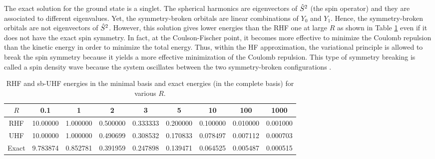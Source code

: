 \documentclass[11pt,a4paper]{article}
\newcommand{\hS}{\Hat{S}}
\begin{document}
The exact solution for the ground state is a singlet. The spherical harmonics are eigenvectors of $\hS^2$ (the spin operator) and they are associated to different eigenvalues. Yet, the symmetry-broken orbitals are linear combinations of $Y_0$ and $Y_1$. Hence, the symmetry-broken orbitals are not eigenvectors of $\hS^2$. However, this solution gives lower energies than the RHF one at large $R$ as shown in Table \ref{tab:ERHFvsEUHF} even if it does not have the exact spin symmetry. In fact, at the Coulson-Fischer point, it becomes more effective to minimize the Coulomb repulsion than the kinetic energy in order to minimize the total energy. Thus, within the HF approximation, the variational principle is allowed to break the spin symmetry because it yields a more effective minimization of the Coulomb repulsion. This type of symmetry breaking is called a spin density wave because the system oscillates between the two symmetry-broken configurations \cite{GiulianiBook}.

\begin{table}
\centering
\caption{RHF and sb-UHF energies in the minimal basis and exact energies (in the complete basis) for various $R$.}
\begin{tabular}{ccccccccc}
\hline
\hline
$R$ & 0.1 & 1 & 2 & 3 & 5 & 10 & 100 & 1000 \\
\hline
RHF 	& 10.00000 & 1.000000 & 0.500000 & 0.333333 & 0.200000 & 0.100000 & 0.010000 & 0.001000 \\
UHF 	& 10.00000 & 1.000000 & 0.490699 & 0.308532 & 0.170833 & 0.078497 & 0.007112 & 0.000703 \\
Exact 	& 9.783874 & 0.852781 & 0.391959 & 0.247898 & 0.139471 & 0.064525 & 0.005487 & 0.000515 \\
\hline
\hline
\end{tabular}
\label{tab:ERHFvsEUHF}
\end{table}
\end{document}
